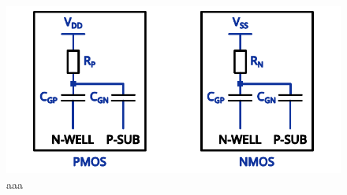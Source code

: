 
\begin{figure}[h]
	\centering
	\includegraphics[width=\columnwidth]{./figures/std_cell_logic_passive.pdf}
	\caption{aaa}
	\label{mos_passive}
\end{figure}
